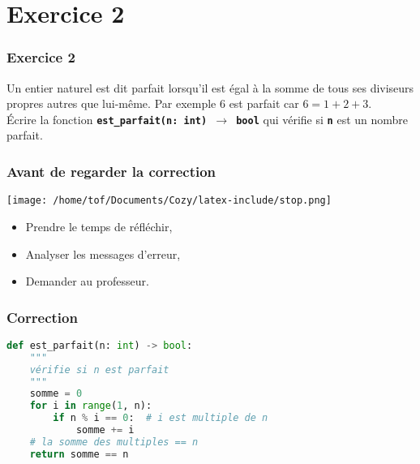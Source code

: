 \documentclass[svgnames,11pt]{beamer}
\begin{document}
\section{Exercice 2}
\begin{frame}
    \frametitle{Exercice 2}

    Un entier naturel est dit parfait lorsqu’il est égal à la somme de tous ses diviseurs propres autres que lui-même. Par exemple 6 est parfait car $6 = 1 + 2 + 3$.\\
    Écrire la fonction \textbf{\texttt{est\_parfait(n: int) $\rightarrow$ bool}} qui vérifie si \textbf{\texttt{n}} est un nombre parfait.

\end{frame}
\begin{frame}
    \frametitle{Avant de regarder la correction}
\begin{center}
    \centering
    \texttt{[image: /home/tof/Documents/Cozy/latex-include/stop.png]}
    \end{center}
{\Large
    \begin{itemize}
        \item Prendre le temps de réfléchir,
        \item Analyser les messages d'erreur,
        \item Demander au professeur.
    \end{itemize}
}
\end{frame}
\begin{frame}[fragile]
    \frametitle{Correction}

\begin{lstlisting}[language=Python , basicstyle=\ttfamily\small, xleftmargin=2em, xrightmargin=2em]
def est_parfait(n: int) -> bool:
    """
    vérifie si n est parfait
    """
    somme = 0
    for i in range(1, n):
        if n % i == 0:  # i est multiple de n
            somme += i
    # la somme des multiples == n
    return somme == n
\end{lstlisting}

\end{frame}
\end{document}
